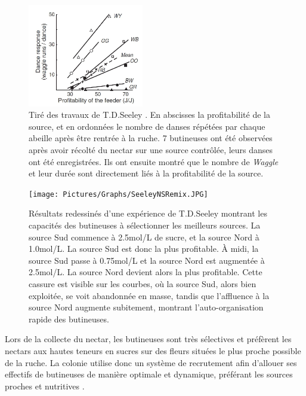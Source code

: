			
	\begin{figure}
	\centering
	\includegraphics[width=0.45\textwidth]{Pictures/Graphs/SeeleyWaggles.JPG}
	\caption[Tiré des travaux de T.D.Seeley \cite{seeley_wisdom_1995}. En abscisses la profitabilité de la source, et en ordonnées le nombre de 8 (de \textit{Waggle}) réalisé par chaque abeilles par danse après être rentrée à la ruche.]{Tiré des travaux de T.D.Seeley \cite{seeley_wisdom_1995}. En abscisses la profitabilité de la source, et en ordonnées le nombre de danses répétées par chaque abeille après être rentrée à la ruche. 7 butineuses ont été observées après avoir récolté du nectar sur une source contrôlée, leurs danses ont été enregistrées. Ils ont ensuite montré que le nombre de \textit{Waggle} et leur durée sont directement liés à la profitabilité de la source.}
	\label{SeeleyWaggles}
	\end{figure}
			
			\begin{figure}
			\centering
			\texttt{[image: Pictures/Graphs/SeeleyNSRemix.JPG]}
				\caption[Résultats redessinés d'une expérience de T.D.Seeley \cite{seeley_collective_1991} montrant les capacités des butineuses à sélectionner les meilleurs sources.]{Résultats redessinés d'une expérience de T.D.Seeley \cite{seeley_collective_1991} montrant les capacités des butineuses à sélectionner les meilleurs sources. La source Sud commence à 2.5mol/L de sucre, et la source Nord à 1.0mol/L. La source Sud est donc la plus profitable. À midi, la source Sud passe à 0.75mol/L et la source Nord est augmentée à 2.5mol/L. La source Nord devient alors la plus profitable. Cette cassure est visible sur les courbes, où la source Sud, alors bien exploitée, se voit abandonnée en masse, tandis que l’affluence à la source Nord augmente subitement, montrant l’auto-organisation rapide des butineuses.}
			\label{SeeleyNS}
			\end{figure}
	
			
			
			Lors de la collecte du nectar, les butineuses sont très sélectives et préfèrent les nectars aux hautes teneurs en sucres sur des fleurs situées le plus proche possible de la ruche. La colonie utilise donc un système de recrutement afin d'allouer ses effectifs de butineuses de manière optimale et dynamique, préférant les sources proches et nutritives \cite{riviere_modemulti-agent_2021}.
	
